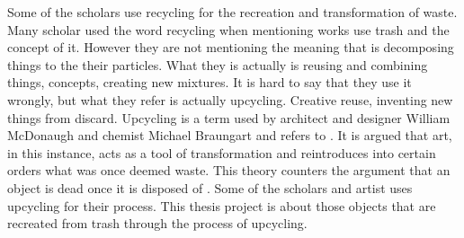 Some of the scholars use recycling \citep{cerny1996recycled,herman1998trashformations} for the recreation and transformation of waste. Many scholar used the word recycling when mentioning works use trash and the concept of it. However they are not mentioning the meaning that is decomposing things to the their particles. What they is actually is reusing and combining things, concepts, creating new mixtures. It is hard to say that they use it wrongly, but what they refer is actually upcycling. Creative reuse, inventing new things from discard. Upcycling is a term used by architect and designer William McDonaugh and chemist Michael Braungart and refers to  \citep[as cited in][63]{emgin2012trashion}. It is argued that art, in this instance, acts as a tool of transformation and reintroduces into certain orders what was once deemed waste. This theory counters the argument that an object is dead once it is disposed of \citep{emgin2012trashion}. Some of the scholars and artist uses upcycling for their process. This thesis project is about those objects that are recreated from trash through the process of upcycling.




